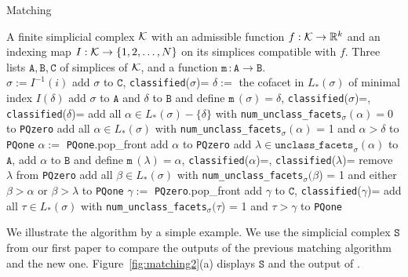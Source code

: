 \documentclass[12pt]{article}
\newcommand{\R}{{\mathbb R}}
\newcommand{\cK}{{\cal K}}
\newcommand{\ma}{\texttt{m}\,} \newcommand{\re}{\texttt{r}\,}
\newcommand{\sS}{\texttt{S}} \newcommand{\sA}{\texttt{A}}
\newcommand{\sB}{\texttt{B}}
\newcommand{\sC}{\texttt{C}} \newcommand{\sD}{\texttt{D}} \newcommand{\sM}{\texttt{M}} \newcommand{\sL}{\texttt{L}}
\begin{document}
\begin{algorithm}[H]
\caption{Matching}
\label{alg-match}
\begin{algorithmic}[1]
 A finite simplicial complex $\cK$ with an admissible function $f : {\cK} \to \R^k$
and an indexing map $I:{\cK} \to \{1,2,\ldots, N\}$ on its simplices compatible with $f$.
 Three lists $\sA,\sB,\sC$ of simplices of $\cK$, and a function $\ma:\sA\to \sB$.\\
\STATE $\sigma:=I^{-1}(i)$
\STATE add $\sigma$ to $\sC$, \texttt{classified}($\sigma$)=\TRUE
\ELSE
\STATE $\delta:=$ the cofacet in $L_*(\sigma)$ of minimal index $I(\delta)$
\STATE add $\sigma$ to $\sA$ and $\delta$ to $\sB$ and define $\ma (\sigma) = \delta$, \texttt{classified}($\sigma$)=\TRUE, \texttt{classified}($\delta$)=\TRUE
\STATE add all  $\alpha \in L_*(\sigma)-\{\delta\}$ with \texttt{{num}\_{unclass}\_{facets}}$_{\sigma} (\alpha)= 0$ to \texttt{PQzero}
\STATE add all  $\alpha \in L_*(\sigma)$ with \texttt{{num}\_{unclass}\_{facets}}$_{\sigma} (\alpha)$ = 1 and  $\alpha > \delta$ to \texttt{PQone}
\STATE $\alpha :=$ \texttt{PQone}.pop\_front
\STATE add $\alpha$ to \texttt{PQzero}
\ELSE
\STATE add $\lambda \in \texttt{{unclass}\_{facets}}_{\sigma} (\alpha)$ to $\sA$, add $\alpha$ to $\sB$ and define $\ma (\lambda) = \alpha$,
\texttt{classified}($\alpha$)=\TRUE, \texttt{classified}($\lambda$)=\TRUE
\STATE remove $\lambda$ from \texttt{PQzero}
\STATE add all  $\beta \in L_*(\sigma)$ with \texttt{{num}\_{unclass}\_{facets}}$_{\sigma} (\beta$) = 1 and
either $\beta > \alpha$ or $\beta > \lambda$ to \texttt{PQone}
\ENDIF
\ENDWHILE
{}
\STATE $\gamma :=$ \texttt{PQzero}.pop\_front
\STATE add $\gamma$ to $\sC$, \texttt{classified}($\gamma$)=\TRUE
\STATE add all  $\tau \in L_*(\sigma)$ with \texttt{{num}\_{unclass}\_{facets}}$_{\sigma} (\tau$) = 1 and
$\tau > \gamma$ to \texttt{PQone}
\ENDIF
\ENDWHILE
\ENDIF
\ENDIF
\ENDFOR
\end{algorithmic}
\end{algorithm}


We illustrate the algorithm by a simple example. We use the simplicial complex $\sS$ from our first paper \cite[Figure 2]{AlKaLa17} to compare the outputs of the previous matching algorithm and the new one. Figure~\ref{fig:matching2}(a) displays $\sS$ and the output of \cite[Algorithm 6]{AlKaLa17}.
\end{document}
